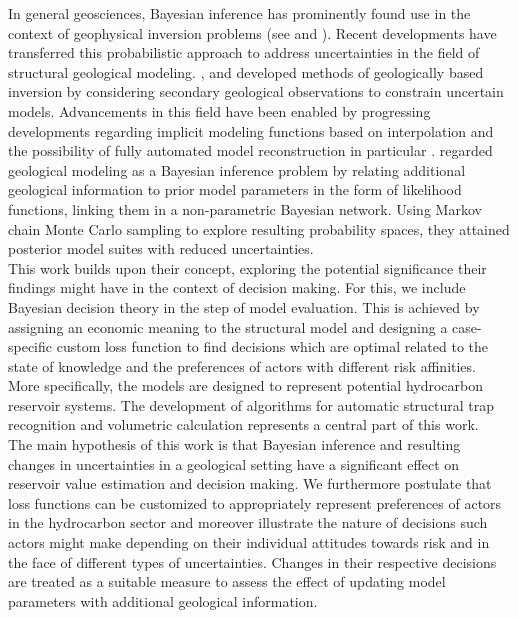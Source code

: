 In general geosciences, Bayesian inference has prominently found use in the context of geophysical inversion problems (see \citet{tarantola1982inverse, mosegaard2002probabilistic} and \citet{sambridge2002monte}). Recent developments have transferred this probabilistic approach to address uncertainties in the field of structural geological modeling. \citet{Caumon2010}, \citet{jessell2010towards} and \citet{wellmann2010towards} developed methods of geologically based inversion by considering secondary geological observations to constrain uncertain models.  Advancements in this field have been enabled by progressing developments regarding implicit modeling functions based on interpolation and the possibility of fully automated model reconstruction in particular \citep{hillier2014three, mallet1992discrete, lajaunie1997foliation}. \citet{delaVarga2016} regarded geological modeling as a Bayesian inference problem by relating additional geological information to prior model parameters in the form of likelihood functions, linking them in a non-parametric Bayesian network. Using Markov chain Monte Carlo sampling to explore resulting probability spaces, they attained posterior model suites with reduced uncertainties.\\
This work builds upon their concept, exploring the potential significance their findings might have in the context of decision making. For this, we include Bayesian decision theory in the step of model evaluation. This is achieved by assigning an economic meaning to the structural model and designing a case-specific custom loss function to find decisions which are optimal related to the state of knowledge and the preferences of actors with different risk affinities. More specifically, the models are designed to represent potential hydrocarbon reservoir systems. The development of algorithms for automatic structural trap recognition and volumetric calculation represents a central part of this work.\\
The main hypothesis of this work is that Bayesian inference and resulting changes in uncertainties in a geological setting have a significant effect on reservoir value estimation and decision making. We furthermore postulate that loss functions can be customized to appropriately represent preferences of actors in the hydrocarbon sector and moreover illustrate the nature of decisions such actors might make depending on their individual attitudes towards risk and in the face of different types of uncertainties. Changes in their respective decisions are treated as a suitable measure to assess the effect of updating model parameters with additional geological information.